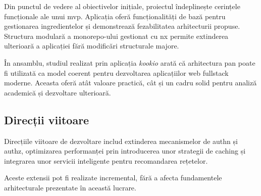 Din punctul de vedere al obiectivelor inițiale, proiectul îndeplinește cerințele funcționale ale unui \gls{mvp}.
Aplicația oferă funcționalități de bază pentru gestionarea ingredientelor și demonstrează fezabilitatea arhitecturii propuse.
Structura modulară a \gls{monorepo}-ului gestionat cu \gls{nx} permite extinderea ulterioară a aplicației fără modificări structurale majore.

În ansamblu, studiul realizat prin aplicația \textit{\gls{kookio}} arată că arhitectura \gls{pan} poate fi utilizată ca model coerent pentru dezvoltarea aplicațiilor \gls{web} \gls{fullstack} moderne.
Aceasta oferă atât valoare practică, cât și un cadru solid pentru analiză academică și dezvoltare ulterioară.

\subsection{Direcții viitoare}\label{sec:roadmap}

Direcțiile viitoare de dezvoltare includ extinderea mecanismelor de \gls{authn} și \gls{authz}, optimizarea performanței prin introducerea unor strategii de \gls{caching} și integrarea unor servicii inteligente pentru recomandarea rețetelor.

Aceste extensii pot fi realizate incremental, fără a afecta fundamentele arhitecturale prezentate în această lucrare.
